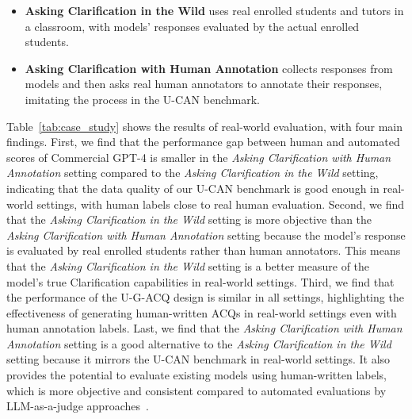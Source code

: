 \documentclass{article} %
\theoremstyle{definition}
\begin{document}
\begin{itemize}[leftmargin=0.5cm,topsep=-0.8\parskip,noitemsep,nolistsep]
    \item \textbf{Asking Clarification in the Wild} uses real enrolled students and tutors in a classroom, with models' responses evaluated by the actual enrolled students.
    \item \textbf{Asking Clarification with Human Annotation} collects responses from models and then asks real human annotators to annotate their responses, imitating the process in the U-CAN benchmark.
\end{itemize}
Table~\ref{tab:case_study} shows the results of real-world evaluation, with four main findings.
First, we find that the performance gap between human and automated scores of Commercial GPT-4 is smaller in the \textit{Asking Clarification with Human Annotation} setting compared to the \textit{Asking Clarification in the Wild} setting, indicating that the data quality of our U-CAN benchmark is good enough in real-world settings, with human labels close to real human evaluation.
Second, we find that the \textit{Asking Clarification in the Wild} setting is more objective than the \textit{Asking Clarification with Human Annotation} setting because the model's response is evaluated by real enrolled students rather than human annotators. This means that the \textit{Asking Clarification in the Wild} setting is a better measure of the model's true Clarification capabilities in real-world settings.
Third, we find that the performance of the U-G-ACQ design is similar in all settings, highlighting the effectiveness of generating human-written ACQs in real-world settings even with human annotation labels.
Last, we find that the \textit{Asking Clarification with Human Annotation} setting is a good alternative to the \textit{Asking Clarification in the Wild} setting because it mirrors the U-CAN benchmark in real-world settings.
It also provides the potential to evaluate existing models using human-written labels, which is more objective and consistent compared to automated evaluations by LLM-as-a-judge approaches~\citep{llm_as_judge,agentboard,mt_preference}.
\end{document}
